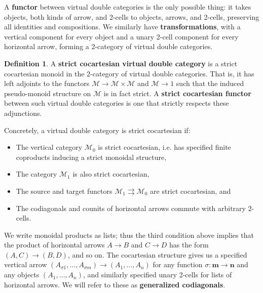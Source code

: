 \documentclass{article}
\theoremstyle{definition}
\newtheorem{defn}[thm]{Definition}
\theoremstyle{remark}
\def\M{\mathcal{M}}
\begin{document}
A \textbf{functor} between virtual double categories is the only possible thing: it takes objects, both kinds of arrow, and 2-cells to objects, arrows, and 2-cells, preserving all identities and compositions.
We similarly have \textbf{transformations}, with a vertical component for every object and a unary 2-cell component for every horizontal arrow, forming a 2-category of virtual double categories.

\begin{defn}
  A \textbf{strict cocartesian virtual double category} is a strict cocartesian monoid in the 2-category of virtual double categories.
  That is, it has left adjoints to the functors $\M \to \M\times\M$ and $\M\to 1$ such that the induced pseudo-monoid structure on $\M$ is in fact strict.
  A \textbf{strict cocartesian functor} between such virtual double categories is one that strictly respects these adjunctions.
\end{defn}

Concretely, a virtual double category is strict cocartesian if:
\begin{itemize}
\item The vertical category $\M_0$ is strict cocartesian, i.e. has specified finite coproducts inducing a strict monoidal structure,
\item The category $\M_1$ is also strict cocartesian,
\item The source and target functors $\M_1 \rightrightarrows \M_0$ are strict cocartesian, and
\item The codiagonals and counits of horizontal arrows commute with arbitrary 2-cells.
\end{itemize}
We write monoidal products as lists; thus the third condition above implies that the product of horizontal arrows $A\to B$ and $C\to D$ has the form $(A,C)\to (B,D)$, and so on.
The cocartesian structure gives us a specified vertical arrow $(A_{\sigma 1},\dots, A_{\sigma m}) \to (A_1,\dots, A_n)$ for any function $\sigma:\mathbf{m}\to \mathbf{n}$ and any objects $(A_1,\dots, A_n)$, and similarly specified unary 2-cells for lists of horizontal arrows.
We will refer to these as \textbf{generalized codiagonals}.
\end{document}
